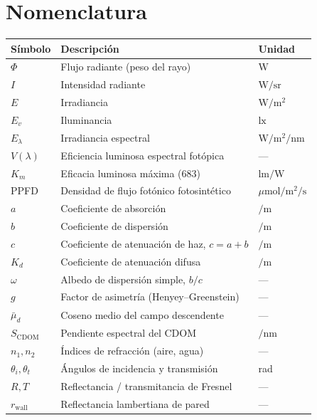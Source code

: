 \documentclass[11pt,a4paper]{article}
\newcommand{\si}[1]{\ensuremath{#1}}
\newcommand{\watt}{\mathrm{W}}
\newcommand{\meter}{\mathrm{m}}
\newcommand{\second}{\mathrm{s}}
\newcommand{\lux}{\mathrm{lx}}
\newcommand{\lumen}{\mathrm{lm}}
\newcommand{\mol}{\mathrm{mol}}
\newcommand{\steradian}{\mathrm{sr}}
\newcommand{\per}{/}
\renewcommand{\square}[1]{#1^{2}}
\newcommand{\micro}[1]{\upmu #1}
\newcommand{\nano}[1]{\mathrm{n}#1}
\providecommand{\upmu}{\mu}
\begin{document}
\section{Nomenclatura}\label{sec:nomenclatura}

\begin{longtable}{p{2.6cm}p{8.5cm}p{3cm}}
\toprule
\textbf{Símbolo} & \textbf{Descripción} & \textbf{Unidad} \\
\midrule
\endhead
$\Phi$ & Flujo radiante (peso del rayo) & \si{\watt} \\
$I$ & Intensidad radiante & \si{\watt\per\steradian} \\
$E$ & Irradiancia & \si{\watt\per\square\meter} \\
$E_v$ & Iluminancia & \si{\lux} \\
$E_\lambda$ & Irradiancia espectral & \si{\watt\per\square\meter\per\nano\meter} \\
$V(\lambda)$ & Eficiencia luminosa espectral fotópica & --- \\
$K_m$ & Eficacia luminosa máxima ($683$) & \si{\lumen\per\watt} \\
PPFD & Densidad de flujo fotónico fotosintético & \si{\micro\mol\per\square\meter\per\second} \\
$a$ & Coeficiente de absorción & \si{\per\meter} \\
$b$ & Coeficiente de dispersión & \si{\per\meter} \\
$c$ & Coeficiente de atenuación de haz, $c=a+b$ & \si{\per\meter} \\
$K_d$ & Coeficiente de atenuación difusa & \si{\per\meter} \\
$\omega$ & Albedo de dispersión simple, $b/c$ & --- \\
$g$ & Factor de asimetría (Henyey--Greenstein) & --- \\
$\bar\mu_d$ & Coseno medio del campo descendente & --- \\
$S_\text{CDOM}$ & Pendiente espectral del CDOM & \si{\per\nano\meter} \\
$n_1, n_2$ & Índices de refracción (aire, agua) & --- \\
$\theta_i,\theta_t$ & Ángulos de incidencia y transmisión & rad \\
$R, T$ & Reflectancia / transmitancia de Fresnel & --- \\
$r_\text{wall}$ & Reflectancia lambertiana de pared & --- \\

\end{longtable}
\end{document}
